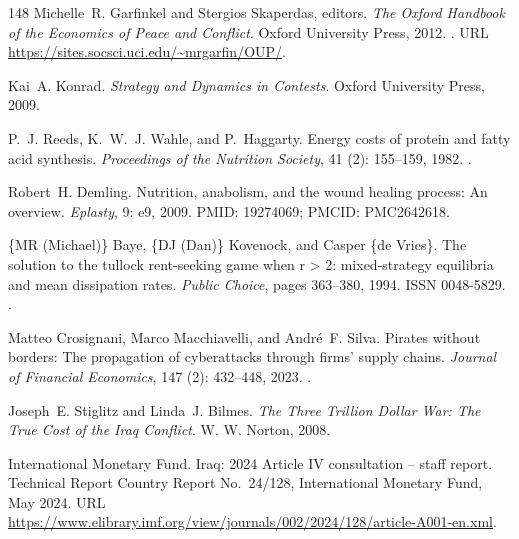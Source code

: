 \documentclass[11pt]{article}
\theoremstyle{plain}
\theoremstyle{definition}
\theoremstyle{remark}
\begin{document}
\begin{thebibliography}{148}
Michelle~R. Garfinkel and Stergios Skaperdas, editors.
\newblock \emph{The Oxford Handbook of the Economics of Peace and Conflict}.
\newblock Oxford University Press, 2012.
\newblock {}.
\newblock URL \url{https://sites.socsci.uci.edu/~mrgarfin/OUP/}.

Kai~A. Konrad.
\newblock \emph{Strategy and Dynamics in Contests}.
\newblock Oxford University Press, 2009.

P.~J. Reeds, K.~W.~J. Wahle, and P.~Haggarty.
\newblock Energy costs of protein and fatty acid synthesis.
\newblock \emph{Proceedings of the Nutrition Society}, 41
  (2): 155--159, 1982.
\newblock {}.

Robert~H. Demling.
\newblock Nutrition, anabolism, and the wound healing process: An overview.
\newblock \emph{Eplasty}, 9: e9, 2009.
\newblock PMID: 19274069; PMCID: PMC2642618.

\{MR (Michael)\} Baye, \{DJ (Dan)\} Kovenock, and Casper \{de Vries\}.
\newblock The solution to the tullock rent-seeking game when r > 2:
  mixed-strategy equilibria and mean dissipation rates.
\newblock \emph{Public Choice}, pages 363--380, 1994.
\newblock ISSN 0048-5829.
\newblock {}.

Matteo Crosignani, Marco Macchiavelli, and Andr{\'e}~F. Silva.
\newblock Pirates without borders: The propagation of cyberattacks through
  firms' supply chains.
\newblock \emph{Journal of Financial Economics}, 147 (2):
  432--448, 2023.
\newblock {}.

Joseph~E. Stiglitz and Linda~J. Bilmes.
\newblock \emph{The Three Trillion Dollar War: The True Cost of the {Iraq}
  Conflict}.
\newblock W. W. Norton, 2008.

{International Monetary Fund}.
\newblock Iraq: 2024 {Article IV} consultation -- staff report.
\newblock Technical Report Country Report No.\ 24/128, International Monetary
  Fund, May 2024.
\newblock URL
  \url{https://www.elibrary.imf.org/view/journals/002/2024/128/article-A001-en.xml}.


\end{thebibliography}
\end{document}
